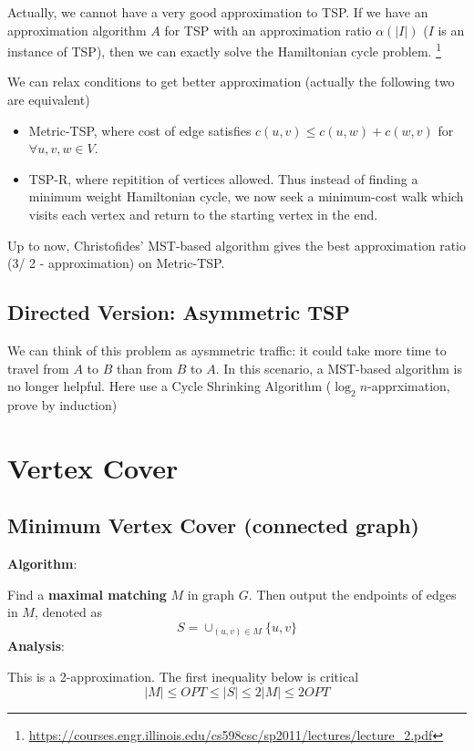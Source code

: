 \documentclass[11pt]{article}
\begin{document}
    Actually, we cannot have a very good approximation to TSP. If we have an approximation algorithm $A$ for TSP with an approximation ratio $\alpha(|I|)$ ($I$ is an instance of TSP), then we can exactly solve the Hamiltonian cycle problem. \footnote{\url{https://courses.engr.illinois.edu/cs598csc/sp2011/lectures/lecture_2.pdf}}

    We can relax conditions to get better approximation (actually the following two are equivalent)
    \begin{itemize}
      \item Metric-TSP, where cost of edge satisfies $c(u, v) \le c(u, w) + c(w, v)$ for $\forall u, v, w \in V$.
      \item TSP-R, where repitition of vertices allowed. Thus instead of finding a minimum weight Hamiltonian cycle, we now seek a minimum-cost walk which visits each vertex and return to the starting vertex in the end. 
    \end{itemize}

    Up to now, Christofides' MST-based algorithm gives the best approximation ratio (3/ 2 - approximation) on Metric-TSP. 

  \subsection{Directed Version: Asymmetric TSP}
    We can think of this problem as aysmmetric traffic: it could take more time to travel from $A$ to $B$ than from $B$ to $A$. In this scenario, a MST-based algorithm is no longer helpful. Here use a Cycle Shrinking Algorithm ($\log_2n$-apprximation, prove by induction)

\section{Vertex Cover}
  \subsection{Minimum Vertex Cover (connected graph)}
    \textbf{Algorithm}:

      Find a \textbf{maximal matching} $M$ in graph $G$. Then output the endpoints of edges in $M$, denoted as 
      \[
        S = \cup_{(u, v) \in M}\{u, v\} 
      \]
    \textbf{Analysis}:

      This is a 2-approximation. The first inequality below is critical
      \[
        |M| \le OPT \le |S| \le 2 |M| \le 2 OPT
      \]
\end{document}
